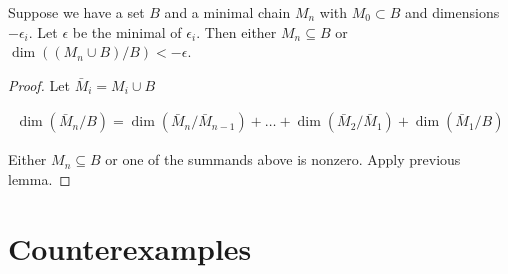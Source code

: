 \documentclass{amsart}
\renewcommand{\AA}{\mathscr A}
\begin{document}
\begin{Lemma}	\label{chain_lemma}
	Suppose we have a set $B$ and a minimal chain $M_n$ with $M_0 \subset B$ and dimensions $-\epsilon_i$.
Let $\epsilon$ be the minimal of $\epsilon_i$.
Then either $M_n \subseteq B$ or $\dim((M_n \cup B)/B) < -\epsilon$.
\end{Lemma}


\begin{proof}
	Let $\bar M_i = M_i \cup B$

	\begin{align*}
		\dim(\bar M_n/B) = \dim(\bar M_n/\bar M_{n-1}) + \ldots + \dim(\bar M_2/\bar M_1) + \dim(\bar M_1/B)
	\end{align*}

	Either $M_n \subseteq B$ or one of the summands above is nonzero.
	Apply previous lemma.
\end{proof}

\section{Counterexamples}



\end{document}

